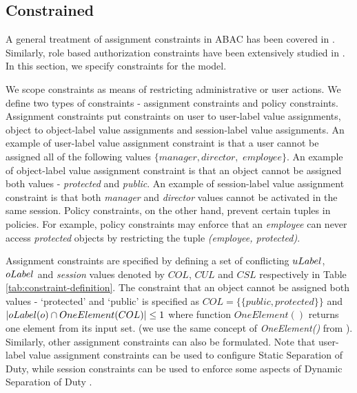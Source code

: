 	
	
	
	
	\subsection{Constrained \eapABAC{}}
	A general treatment of assignment constraints in ABAC has been covered in  \cite{abcl}. Similarly, role based authorization constraints have been extensively studied in \cite{rcl}.	
	In this section, we specify constraints for the \eapABAC{} model. 
	
	We scope constraints as  means of restricting administrative or user actions. We define two types of constraints - assignment constraints and  policy constraints. Assignment constraints put constraints on user to user-label value assignments,  object to object-label value assignments and session-label value assignments. An example of user-label value assignment constraint is that a user cannot be assigned all of the following values $\{manager, director,$  $employee\}$.  An example of object-label value assignment constraint is that an object cannot be assigned both values - \textit{protected} and \textit{public}. An example of session-label value assignment constraint is that both \textit{manager} and \textit{director} values cannot be activated in the same session.	 Policy constraints, on the other hand,  prevent certain tuples in policies. For example, policy constraints may enforce that an \textit{employee} can never access \textit{protected} objects by restricting the tuple \textit{(employee, protected)}.  
	
	
	
	
		
		 
		 
	Assignment constraints are specified by defining a set of conflicting $uLabel$, $oLabel$ and \textit{session} values denoted by $COL$, $CUL$ and $CSL$ respectively in Table \ref{tab:constraint-definition}.  The constraint that an object cannot be assigned both values - `protected' and `public' is specified as $COL=\{\{public, protected\}\}$ and $ |oLabel(o) \cap OneElement(COL)| \le 1$ where function $OneElement()$ returns one element from its input set. (we use the same concept of \textit{OneElement()} from \cite{rcl}).  Similarly, other  assignment constraints can also be formulated. Note that user-label value assignment constraints can be used to configure  Static Separation of Duty, while session constraints can be used to enforce some aspects of  Dynamic Separation of Duty \cite{dsod}.

